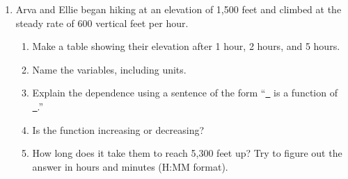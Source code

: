 \documentclass[12pt]{article}
\begin{document}
\begin{enumerate}
 
 \item Arva and Ellie began hiking at an elevation of 1,500 feet and climbed at the steady rate of 600 vertical feet per hour. %
\begin{enumerate}
\item Make a table showing their elevation after 1 hour, 2 hours, and 5 hours. \vfill \vfill
\item Name the variables, including units. \vfill \vfill
\item Explain the dependence using a sentence of the form ``\underline{~\quad} is a function of \underline{~\quad}.'' \vfill
\item Is the function increasing or decreasing? \vfill
\item How long does it take them to reach 5,300 feet up?  Try to figure out the answer in hours and minutes (H:MM format). \vfill \vfill \vfill
\end{enumerate}


\newpage


\end{enumerate}
\end{document}
